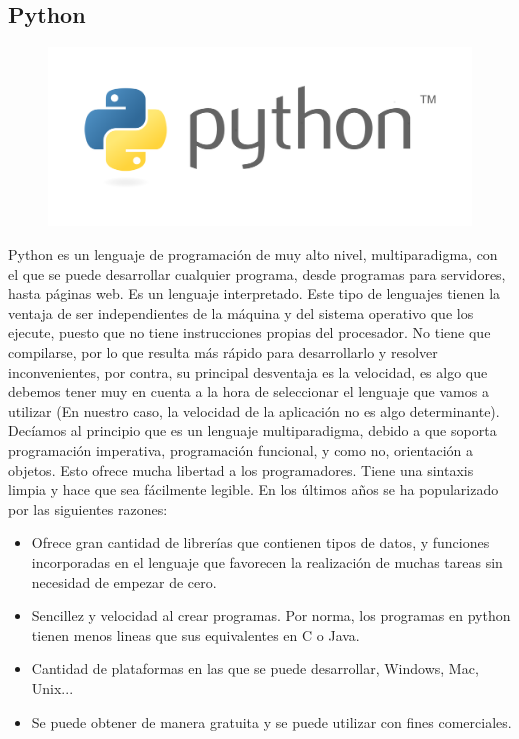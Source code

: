 \documentclass[a4paper, 12pt]{book}
\begin{document}
\subsection{Python} 
\begin{figure}[hbtp]
\centering
\includegraphics[scale=0.1]{img/Python-logo.png} 
\end{figure}
Python es un lenguaje de programación de muy alto nivel, multiparadigma, con el que se puede desarrollar cualquier programa, desde programas para servidores, hasta páginas web. Es un lenguaje interpretado. Este tipo de lenguajes tienen la ventaja de ser independientes de la máquina y del sistema operativo que los ejecute, puesto que no tiene instrucciones propias del procesador. No tiene que compilarse, por lo que resulta más rápido para desarrollarlo y resolver inconvenientes, por contra, su principal desventaja es la velocidad, es algo que debemos tener muy en cuenta a la hora de seleccionar el lenguaje que vamos a utilizar (En nuestro caso, la velocidad de la aplicación no es algo determinante).
Decíamos al principio que es un lenguaje multiparadigma, debido a que soporta programación imperativa, programación funcional, y como no, orientación a objetos. Esto ofrece mucha libertad a los programadores.
Tiene una sintaxis limpia y hace que sea fácilmente legible. En los últimos años se ha popularizado por las siguientes razones:
\begin{itemize}
\item Ofrece gran cantidad de librerías que contienen tipos de datos, y funciones incorporadas en el lenguaje que favorecen la realización de muchas tareas sin necesidad de empezar de cero.
\item Sencillez y velocidad al crear programas. Por norma, los programas en python tienen menos lineas que sus equivalentes en C o Java.
\item Cantidad de plataformas en las que se puede desarrollar, Windows, Mac, Unix...
\item Se puede obtener de manera gratuita  y se puede utilizar con fines comerciales.
\end{itemize}
\end{document}
